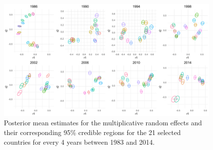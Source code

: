 \documentclass[a4paper]{article}
\begin{document}
\begin{figure}[ht]
  	\begin{center}  
  		 \includegraphics[width=1\textwidth]{plots_paper/UDU_reduced_8years-1.png}
  	\end{center}
  	\caption {Posterior mean estimates for the multiplicative random effects and their corresponding 95\% credible regions for the 21 selected countries for every 4 years between 1983 and 2014.  }
  	\label{figure:UDplot}
  \end{figure}
  \newpage
\end{document}
